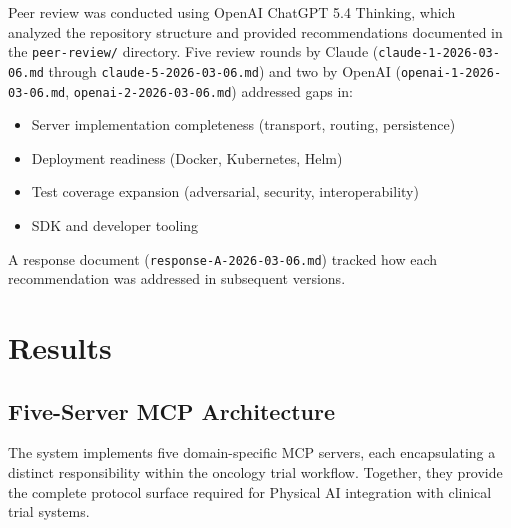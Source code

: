 \documentclass{article}
\begin{document}
Peer review was conducted using OpenAI ChatGPT 5.4 Thinking, which analyzed the repository structure and provided recommendations documented in the \texttt{peer-review/} directory. Five review rounds by Claude (\texttt{claude-1-2026-03-06.md} through \texttt{claude-5-2026-03-06.md}) and two by OpenAI (\texttt{openai-1-2026-03-06.md}, \texttt{openai-2-2026-03-06.md}) addressed gaps in:

\begin{itemize}[leftmargin=*]
\item Server implementation completeness (transport, routing, persistence)
\item Deployment readiness (Docker, Kubernetes, Helm)
\item Test coverage expansion (adversarial, security, interoperability)
\item SDK and developer tooling
\end{itemize}

A response document (\texttt{response-A-2026-03-06.md}) tracked how each recommendation was addressed in subsequent versions.

\section{Results}
\label{sec:results}

\subsection{Five-Server MCP Architecture}

The system implements five domain-specific MCP servers, each encapsulating a distinct responsibility within the oncology trial workflow. Together, they provide the complete protocol surface required for Physical AI integration with clinical trial systems.
\end{document}
